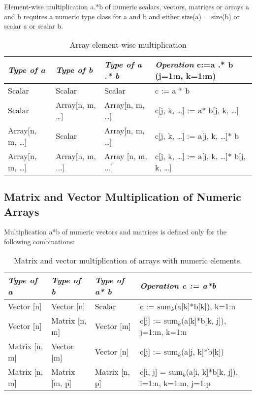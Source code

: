 Element-wise multiplication a.*b of numeric scalars, vectors, matrices
or arrays a and b requires a numeric type class for a and b and either
size(a) = size(b) or scalar a or scalar b.

\begin{longtable}[]{|l|l|l|l|}
\caption{Array element-wise multiplication}\\
\hline
\emph{Type of a} & \emph{Type of b} & \emph{Type of a .* b} &
\emph{Operation} c:=a .* b (j=1:n, k=1:m)\\ \hline
\endhead
Scalar & Scalar & Scalar & c := a * b\\ \hline
Scalar & Array{[}n, m, \ldots{}{]} & Array{[}n, m, \ldots{}{]} & c{[}j,
k, \ldots{}{]} := a* b{[}j, k, \ldots{}{]}\\ \hline
Array{[}n, m, \ldots{}{]} & Scalar & Array{[}n, m, \ldots{}{]} & c{[}j,
k, \ldots{}{]} := a{[}j, k, \ldots{}{]}* b\\ \hline
Array{[}n, m, \ldots{}{]} & Array{[}n, m, ...{]} & Array {[}n, m, ...{]}
& c{[}j, k, \ldots{}{]} := a{[}j, k, \ldots{}{]}* b{[}j, k,
\ldots{}{]}\\ \hline
\end{longtable}

\subsection{Matrix and Vector Multiplication of Numeric Arrays}

Multiplication a*b of numeric vectors and matrices is defined only for
the following combinations:

\begin{longtable}[]{|l|l|l|l|}
\caption{Matrix and vector multiplication of arrays with numeric elements.}\\
\hline
\emph{Type of a} & \emph{Type of b} & \emph{Type of a* b} &
\emph{Operation c := a*b}\\ \hline
\endhead
Vector {[}n{]} & Vector {[}n{]} & Scalar & c :=
$\textrm{sum}_k$(a{[}k{]}*b{[}k{]}), k=1:n\\ \hline
Vector {[}n{]} & Matrix {[}n, m{]} & Vector {[}m{]} & c{[}j{]} :=
$\textrm{sum}_k$(a{[}k{]}*b{[}k, j{]}), j=1:m, k=1:n\\ \hline
Matrix {[}n, m{]} & Vector {[}m{]} & Vector {[}n{]} & c{[}j{]} :=
$\textrm{sum}_k$(a{[}j, k{]}*b{[}k{]})\\ \hline
Matrix {[}n, m{]} & Matrix {[}m, p{]} & Matrix {[}n, p{]} & c{[}i, j{]}
= $\textrm{sum}_k$(a{[}i, k{]}*b{[}k, j{]}), i=1:n, k=1:m,
j=1:p\\ \hline

\end{longtable}


